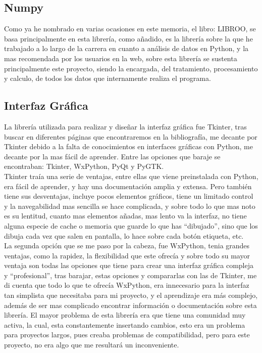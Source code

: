\subsection{Numpy}
Como ya he nombrado en varias ocasiones en este memoria, el libro: LIBROO, se basa principalmente en esta librería, como añadido, es la librería sobre la que he trabajado a lo largo de la carrera en cuanto a análisis de datos en Python, y la mas recomendada por los usuarios en la web, sobre esta librería se sustenta principalmente este proyecto, siendo la encargada, del tratamiento, procesamiento y calculo, de todos los datos que internamente realiza el programa.
\subsection{Interfaz Gráfica}
La librería utilizada para realizar y diseñar la interfaz gráfica fue Tkinter, tras buscar en diferentes páginas que encontraremos en la bibliografía, me decante por Tkinter debido a la falta de conocimientos en interfaces gráficas con Python, me decante por la mas fácil de aprender. Entre las opciones que baraje se encontraban: Tkinter, WxPython, PyQt y PyGTK.\\

Tkinter traía una serie de ventajas, entre ellas que viene preinstalada con Python, era fácil de aprender, y hay una documentación amplia y extensa. Pero también tiene sus desventajas, incluye pocos elementos gráficos, tiene un limitado control y la navegabilidad mas sencilla se hace complicada, y sobre todo lo que mas noto es su lentitud, cuanto mas elementos añadas, mas lento va la interfaz, no tiene alguna especie de cache o memoria que guarde lo que has “dibujado”, sino que los dibuja cada vez que salen en pantalla, lo hace sobre cada botón etiqueta, etc.\\

La segunda opción que se me paso por la cabeza, fue WxPython,  tenia grandes ventajas, como la rapidez,  la flexibilidad que este ofrecía y sobre todo su mayor ventaja son todas las opciones que tiene para crear una interfaz gráfica compleja y “profesional”, tras barajar, estas opciones y compararlas con las de Tkinter, me di cuenta que todo lo que te ofrecía WxPython, era innecesario para la interfaz tan simplista que necesitaba para mi proyecto, y el aprendizaje era más complejo, además de ser mas complicado encontrar información o documentación sobre esta librería. El mayor problema de esta librería era que tiene una comunidad muy activa, la cual, esta constantemente insertando cambios, esto era un problema para proyectos largos, pues creaba problemas de compatibilidad, pero para este proyecto, no era algo que me resultará un inconveniente.\\

